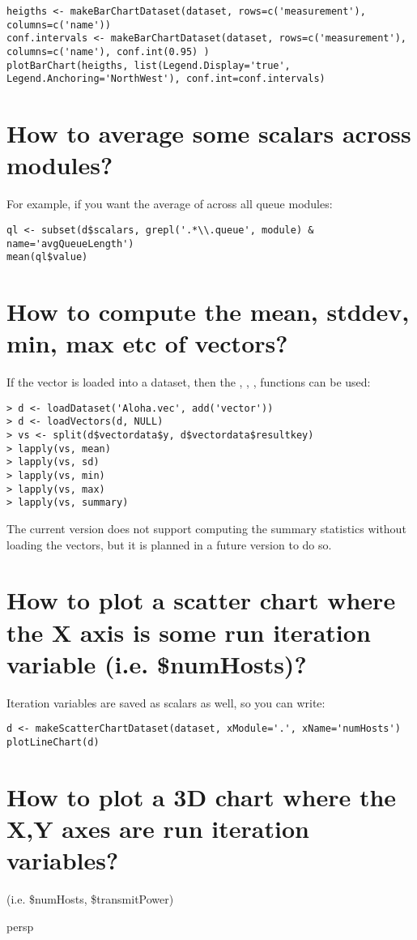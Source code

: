 \begin{verbatim}
heigths <- makeBarChartDataset(dataset, rows=c('measurement'), columns=c('name'))
conf.intervals <- makeBarChartDataset(dataset, rows=c('measurement'), columns=c('name'), conf.int(0.95) )
plotBarChart(heigths, list(Legend.Display='true', Legend.Anchoring='NorthWest'), conf.int=conf.intervals)
\end{verbatim}

\section{How to average some scalars across modules?}

For example, if you want the average of  across all queue modules:

\begin{verbatim}
ql <- subset(d$scalars, grepl('.*\\.queue', module) & name='avgQueueLength')
mean(ql$value)
\end{verbatim}

\section{How to compute the mean, stddev, min, max etc of vectors?}

If the vector is loaded into a dataset, then the , , , 
functions can be used:

\begin{verbatim}
> d <- loadDataset('Aloha.vec', add('vector'))
> d <- loadVectors(d, NULL)
> vs <- split(d$vectordata$y, d$vectordata$resultkey)
> lapply(vs, mean)
> lapply(vs, sd)
> lapply(vs, min)
> lapply(vs, max)
> lapply(vs, summary)
\end{verbatim}

The current version does not support computing the summary statistics without loading the vectors,
but it is planned in a future version to do so.

\section{How to plot a scatter chart where the X axis is some run iteration
variable (i.e. \$numHosts)?}

Iteration variables are saved as scalars as well, so you can write:

\begin{verbatim}
d <- makeScatterChartDataset(dataset, xModule='.', xName='numHosts')
plotLineChart(d)
\end{verbatim}

\section{How to plot a 3D chart where the X,Y axes are run iteration variables?}

(i.e. \$numHosts, \$transmitPower)

persp

